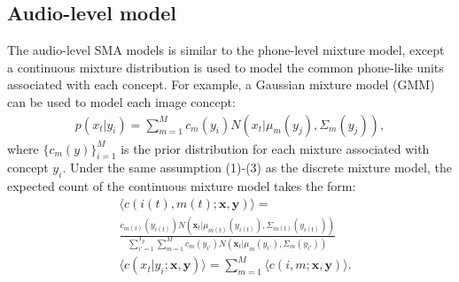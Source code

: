 \documentclass[journal]{IEEEtran}
\begin{document}
\subsection{Audio-level model}
The audio-level SMA models is similar to the phone-level mixture model, except a continuous mixture distribution is used to model the common phone-like units associated with each concept. For example, a Gaussian mixture model (GMM) can be used to model each image concept:
\begin{align}\label{eq:gmm_prob}
    p(x_t|y_i) = \sum_{m=1}^{M} c_m(y_i) N( x_t|\mu_m(y_j), \Sigma_m(y_j)),
\end{align}
where $\{c_m(y)\}_{i=1}^M$ is the prior distribution for each mixture associated with concept $y_i$. Under the same assumption (1)-(3) as the discrete mixture model, the expected count of the continuous mixture model takes the form:
\begin{align}\label{eq:expected_count_gmm}
    &\langle c(i(t), m(t);\mathbf x, \mathbf y) \rangle =\nonumber\\ &\frac{c_{m(t)}(y_{i(t)})N(\mathbf x_t|\mu_{m(t)}(y_{i(t)}), \Sigma_{m(t)}(y_{i(t)}))}{\sum_{i'=1}^{T_y} \sum_{m=1}^M c_m(y_{i'})N(\mathbf x_t|\mu_m(y_{i'}), \Sigma_m(y_{i'}))} \\
    &\langle c(x_t|y_i; \mathbf x, \mathbf y) \rangle = \sum_{m=1}^M \langle c(i, m; \mathbf x, \mathbf y) \rangle.
\end{align}
\end{document}
